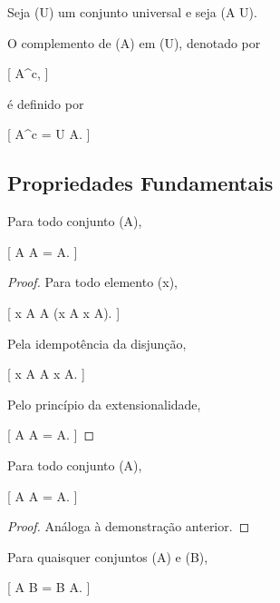 \documentclass[../../main]{subfiles}
\begin{document}
\begin{defn}[Complemento]
	\label{def:matematica:teoria-conjuntos:operacoes:complemento}

	Seja (U) um conjunto universal e seja (A \subseteq U).

	O complemento de (A) em (U), denotado por

		[
			A^{c},
		]

	é definido por

		[
			A^{c}
			=
			U \setminus A.
		]

\end{defn}

\subsection{Propriedades Fundamentais}

\begin{prop}

	Para todo conjunto (A),

	[
			A \cup A = A.
		]

\end{prop}

\begin{proof}

	Para todo elemento (x),

	[
			x \in A \cup A
			\Leftrightarrow
			(x \in A \lor x \in A).
		]

	Pela idempotência da disjunção,

	[
			x \in A \cup A
			\Leftrightarrow
			x \in A.
		]

	Pelo princípio da extensionalidade,

	[
			A \cup A = A.
		]

\end{proof}

\begin{prop}

	Para todo conjunto (A),

	[
			A \cap A = A.
		]

\end{prop}

\begin{proof}

	Análoga à demonstração anterior.

\end{proof}

\begin{prop}

	Para quaisquer conjuntos (A) e (B),

	[
			A \cup B = B \cup A.
		]

\end{prop}
\end{document}
